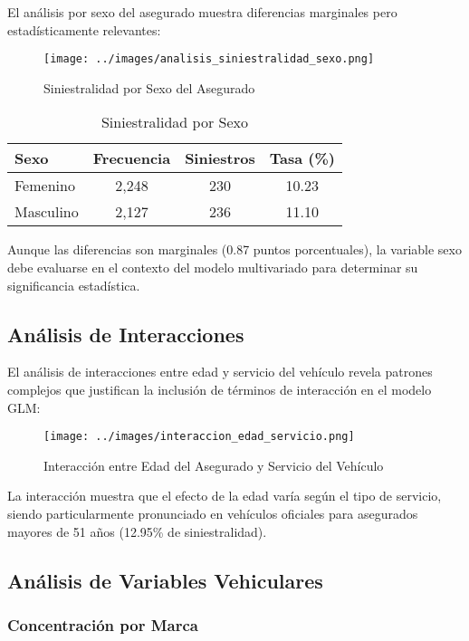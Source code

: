 El análisis por sexo del asegurado muestra diferencias marginales pero estadísticamente relevantes:

\begin{figure}[H]
\centering
\texttt{[image: ../images/analisis\_siniestralidad\_sexo.png]}
\caption{Siniestralidad por Sexo del Asegurado}
\end{figure}

\begin{table}[H]
\centering
\caption{Siniestralidad por Sexo}
\begin{tabular}{|l|c|c|c|}
\hline
\textbf{Sexo} & \textbf{Frecuencia} & \textbf{Siniestros} & \textbf{Tasa (\%)} \\
\hline
Femenino & 2,248 & 230 & 10.23 \\
Masculino & 2,127 & 236 & 11.10 \\
\hline
\end{tabular}
\end{table}

Aunque las diferencias son marginales (0.87 puntos porcentuales), la variable sexo debe evaluarse en el contexto del modelo multivariado para determinar su significancia estadística.

\subsection{Análisis de Interacciones}

El análisis de interacciones entre edad y servicio del vehículo revela patrones complejos que justifican la inclusión de términos de interacción en el modelo GLM:

\begin{figure}[H]
\centering
\texttt{[image: ../images/interaccion\_edad\_servicio.png]}
\caption{Interacción entre Edad del Asegurado y Servicio del Vehículo}
\end{figure}

La interacción muestra que el efecto de la edad varía según el tipo de servicio, siendo particularmente pronunciado en vehículos oficiales para asegurados mayores de 51 años (12.95\% de siniestralidad).

\subsection{Análisis de Variables Vehiculares}

\subsubsection{Concentración por Marca}

